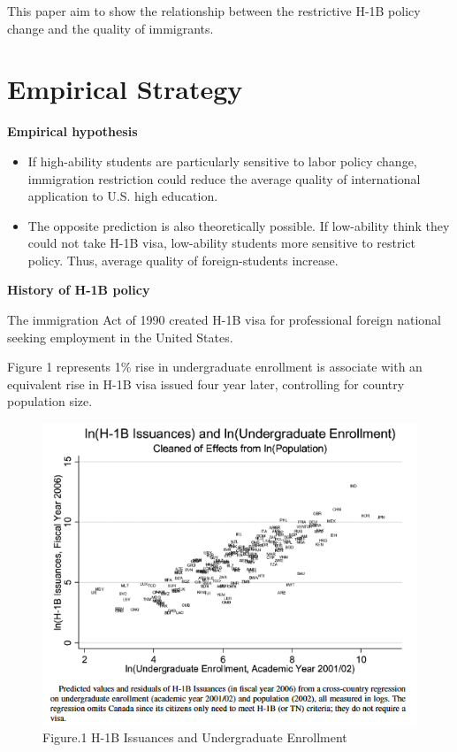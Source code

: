\documentclass[../root]{subfiles}
\begin{document}
     This paper aim to show the relationship between the restrictive H-1B policy change and the quality of immigrants.
     
     \section{Empirical Strategy}
    
    
    
    {\bf Empirical hypothesis}
    
    \begin{itemize}
        \item If high-ability students are particularly sensitive to labor policy change, immigration restriction could reduce the average quality of international application to U.S. high education.
        \item The opposite prediction is also theoretically possible. If low-ability think they could not take H-1B visa, low-ability students more sensitive to restrict policy. Thus, average quality of foreign-students increase.   
    \end{itemize}
    
    {\bf History of H-1B policy}
    
    The immigration Act of 1990 created H-1B visa for professional foreign national seeking employment in the United States.
    
    Figure 1 represents 1\% rise in undergraduate enrollment is associate with an equivalent rise in H-1B visa issued four year later, controlling for country population size.
    
    \begin{figure}
        \centering
        \includegraphics[width = \linewidth]{1016sugiyama/Figure_1.png}
        \caption{Figure.1 H-1B Issuances and Undergraduate Enrollment}
        \label{fig:my_label}
    \end{figure}
    
\end{document}
